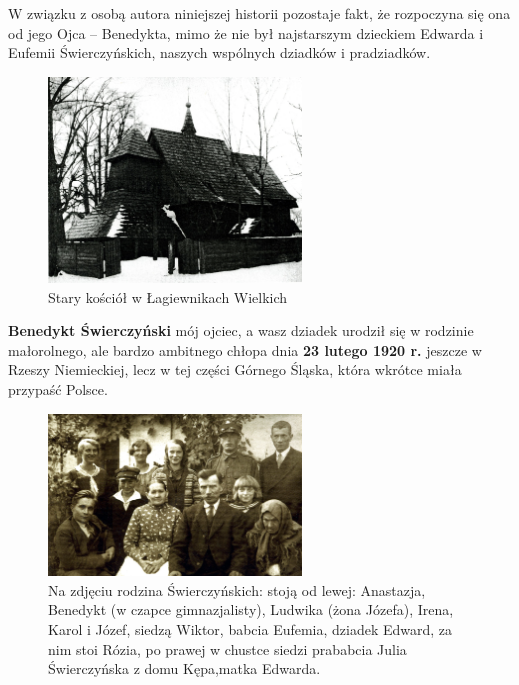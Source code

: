 W związku  z osobą autora niniejszej historii pozostaje fakt, że rozpoczyna się ona od  jego Ojca -- Benedykta, mimo że nie był najstarszym dzieckiem Edwarda i Eufemii Świerczyńskich, naszych wspólnych dziadków i pradziadków.

\begin{figure}[!h]
\begin{center}
\includegraphics[width=0.6\textwidth]{photo/lagiewniki_wielkie.jpg}
\caption{Stary kościół w Łagiewnikach Wielkich}
\label{rys:lagiewniki_wielkie}
\end{center}
\end{figure}

\textbf{Benedykt Świerczyński} mój ojciec, a wasz dziadek urodził się w rodzinie małorolnego, ale bardzo ambitnego chłopa dnia \textbf{23 lutego 1920 r.} jeszcze w Rzeszy Niemieckiej, lecz w tej części Górnego Śląska, która wkrótce miała przypaść Polsce.

\begin{figure}[!h]
\begin{center}
\includegraphics[width=0.6\textwidth]{photo/rodzina_swierczynskich_1.jpg}
\caption[Rodzina Świerczyńskich]{Na zdjęciu rodzina Świerczyńskich: stoją od lewej: Anastazja, Benedykt (w czapce gimnazjalisty), Ludwika (żona Józefa), Irena, Karol i Józef, siedzą Wiktor, babcia Eufemia, dziadek Edward, za nim stoi Rózia, po prawej w chustce siedzi prababcia Julia Świerczyńska z domu Kępa,matka Edwarda.}
\label{rys:rodzina_swierczynskich_1}
\end{center}
\end{figure}

